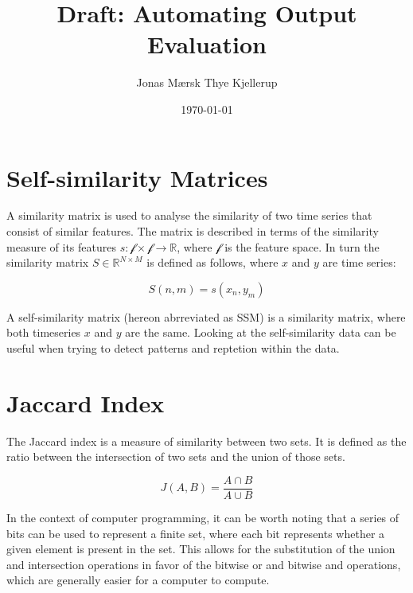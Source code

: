 \documentclass[a4paper]{tufte-handout}
\title{Draft: Automating Output Evaluation}
\author{Jonas Mærsk Thye Kjellerup}
\date{\today}
\begin{document}
\maketitle
\newpage

%
%

\section{Self-similarity Matrices}\label{sec:theory-ssm}
A similarity matrix is used to analyse the similarity of two time series that consist of similar features. The matrix is described in terms of the similarity measure of its features $s : \mathcal{f} \times \mathcal{f} \rightarrow \mathbb{R}$, where $\mathcal{f}$ is the feature space. In turn the similarity matrix $S \in \mathbb{R}^{N \times M}$ is defined as follows, where $x$ and $y$ are time series:

\[ S(n,m)=s(x_n,y_m) \]

A self-similarity matrix (hereon abrreviated as SSM) is a similarity matrix, where both timeseries $x$ and $y$ are the same. Looking at the self-similarity data can be useful when trying to detect patterns and reptetion within the data.


\section{Jaccard Index}\label{sec:theory-jaccard}

The Jaccard index is a measure of similarity between two sets. It is defined as the ratio between the intersection of two sets and the union of those sets. \cite{jaccard}

\[ J(A,B) = \frac{ A \cap B }{ A \cup B} \]

In the context of computer programming, it can be worth noting that a series of bits can be used to represent a finite set, where each bit represents whether a given element is present in the set. This allows for the substitution of the union and intersection operations in favor of the bitwise or and bitwise and operations, which are generally easier for a computer to compute.

%
%
\end{document}
